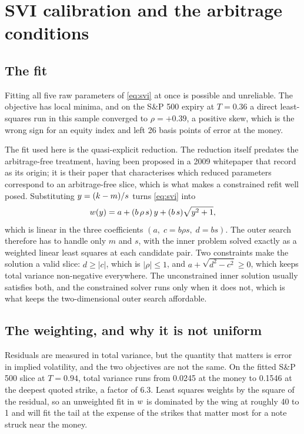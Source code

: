 \section{SVI calibration and the arbitrage conditions}\label{app:svi}

\subsection*{The fit}

Fitting all five raw parameters of \eqref{eq:svi} at once is possible and
unreliable. The objective has local minima, and on the S\&P 500 expiry at
$T = 0.36$ a direct least-squares run in this sample converged to
$\rho = +0.39$, a positive skew, which is the wrong sign for an equity index
and left 26 basis points of error at the money.

The fit used here is the quasi-explicit reduction. The reduction itself
predates the arbitrage-free treatment, having been proposed in a 2009
whitepaper that \citet{MartiniMingone2022} record as its origin; it is their
paper that characterises which reduced parameters correspond to an
arbitrage-free slice, which is what makes a constrained refit well posed.
Substituting
$y = (k - m)/s$ turns \eqref{eq:svi} into
%
\begin{equation}
  w(y) = a + (b\,\rho\,s)\,y + (b\,s)\sqrt{y^2 + 1},
  \label{eq:svi-reduced}
\end{equation}
%
which is linear in the three coefficients $(a,\; c = b\rho s,\; d = bs)$. The
outer search therefore has to handle only $m$ and $s$, with the inner problem
solved exactly as a weighted linear least squares at each candidate pair. Two
constraints make the solution a valid slice: $d \geq |c|$, which is $|\rho| \leq
1$, and $a + \sqrt{d^2 - c^2} \geq 0$, which keeps total variance non-negative
everywhere. The unconstrained inner solution usually satisfies both, and the
constrained solver runs only when it does not, which is what keeps the
two-dimensional outer search affordable.

\subsection*{The weighting, and why it is not uniform}

Residuals are measured in total variance, but the quantity that matters is
error in implied volatility, and the two objectives are not the same. On the
fitted S\&P 500 slice at $T = 0.94$, total variance runs from 0.0245 at the
money to 0.1546 at the deepest quoted strike, a factor of 6.3. Least squares
weights by the square of the residual, so an unweighted fit in $w$ is
dominated by the wing at roughly 40 to 1 and will fit the tail at the expense
of the strikes that matter most for a note struck near the money.

